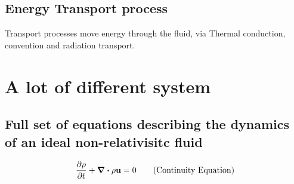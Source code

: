 \documentclass[12pt,a4paper]{article}
\begin{document}
    \subsection{Energy Transport process}
        Transport processes move energy through the fluid, via
        Thermal conduction, convention and radiation transport.
\section{A lot of different system}
    \subsection{Full set of equations describing the dynamics of an ideal non-relativisitc fluid}
        \begin{equation}
            \pdv{\rho}{t} + \div{\rho \vb{u}} = 0 \tag{Continuity Equation}
        \end{equation}
        \begin{equation}
            \tag{Momentum Equation}
        \end{equation} 
        \begin{equation}
            \tag{Poisson's Equation}
        \end{equation}
        \begin{equation}
            \tag{Energy Equation}
        \end{equation}
        \begin{equation}
            \tag{Definition fo Total energy}
        \end{equation}
        \begin{equation}
            \tag{EoS of total energy}
        \end{equation}
        \begin{equation}
            \tag{Internal Energy}
        \end{equation}
\end{document}

